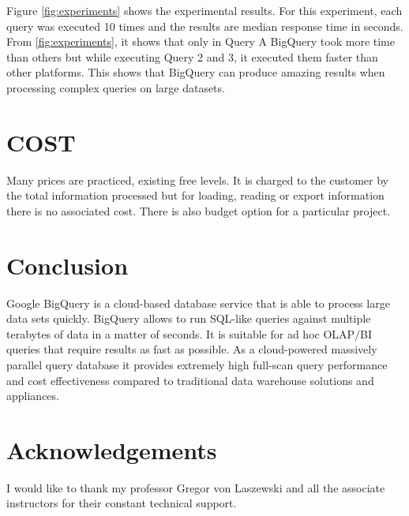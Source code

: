 \documentclass[9pt,twocolumn,twoside]{../../styles/osajnl}
\begin{document}
\noindent
Figure \ref{fig:experiments} shows the experimental results. For this
experiment, each query was executed 10 times and the results are
median response time in seconds. From \ref{fig:experiments}, it shows
that only in Query A BigQuery took more time than others but while
executing Query 2 and 3, it executed them faster than other
platforms. This shows that BigQuery can produce amazing results when
processing complex queries on large datasets.

\section{COST}
Many prices are practiced, existing free levels. It is charged to the
customer by the total information processed but for loading, reading or
export information there is no associated cost.  There is also budget
option for a particular project.

\section{Conclusion}
Google BigQuery is a cloud-based database service that is able to
process large data sets quickly. BigQuery allows to run SQL-like
queries against multiple terabytes of data in a matter of seconds. It
is suitable for ad hoc OLAP/BI queries that require results as fast as
possible. As a cloud-powered massively parallel query database it
provides extremely high full-scan query performance and cost
effectiveness compared to traditional data warehouse solutions and
appliances.

\section*{Acknowledgements}

I would like to thank my professor Gregor von Laszewski and all the
associate instructors for their constant technical support.



 
\newpage

\appendix
\end{document}
